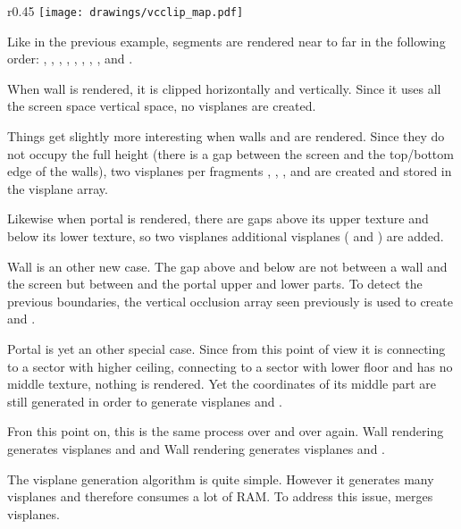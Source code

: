 \begin{wrapfigure}[16]{r}{0.45\textwidth}
\centering
\texttt{[image: drawings/vcclip\_map.pdf]}
\end{wrapfigure}
Like in the previous example, segments are rendered near to far in the following order: , , , , , , , , and .\\
\par
When wall  is rendered, it is clipped horizontally and vertically. Since it uses all the screen space vertical space, no visplanes are created.\\
\par
 Things get slightly more interesting when walls  and  are rendered. Since they do not occupy the full height (there is a gap between the screen and the top/bottom edge of the walls), two visplanes per fragments , , , and  are created and stored in the visplane array.\\
 \par
  Likewise when portal  is rendered, there are gaps above its upper texture and below its lower texture, so two visplanes additional visplanes ( and ) are added.\\
\par
Wall  is an other new case. The gap above and below are not between a wall and the screen but between   and the portal  upper and lower parts. To detect the previous boundaries, the vertical occlusion array seen previously is used to create  and  .\\
\par
Portal  is yet an other special case. Since from this point of view it is connecting to a sector with higher ceiling, connecting to a sector with lower floor and has no middle texture, nothing is rendered. Yet the coordinates of its middle part are still generated in order to generate visplanes  and  .\\
\par
Fron this point on, this is the same process over and over again. Wall  rendering generates visplanes  and   and Wall  rendering generates visplanes  and  .\\
\par
The visplane generation algorithm is quite simple. However it generates many visplanes and therefore consumes a lot of RAM. To address this issue, \doom{} merges visplanes.









